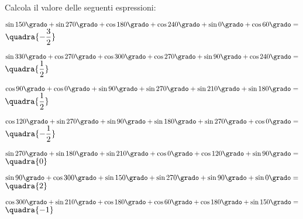 \begin{esercizio}\label{ese:}
 Calcola il valore delle seguenti espressioni:
 \begin{enumeratea}
  \item  $\sin 150 \grado+ \sin 270 \grado+ \cos 180 \grado+ 
          \cos 240 \grado+ \sin 0 \grado+ \cos 60 \grado= $
   \hfill $\quadra{-\dfrac{3}{2}}$
  \item  $\sin 330 \grado+ \cos 270 \grado+ \cos 300 \grado+ 
          \cos 270 \grado+ \sin 90 \grado+ \cos 240 \grado= $
   \hfill $\quadra{\dfrac{1}{2}}$
  \item  $\cos 90 \grado + \cos 0 \grado + \sin 90 \grado + 
          \sin 270 \grado + \sin 210 \grado + \sin 180 \grado = $
   \hfill $\quadra{\dfrac{1}{2}}$
  \item  $\cos 120 \grado + \sin 270 \grado + \sin 90 \grado + 
          \sin 180 \grado + \sin 270 \grado + \cos 0 \grado = $
   \hfill $\quadra{-\dfrac{1}{2}}$
  \item  $\sin 270 \grado + \sin 180 \grado + \sin 210 \grado + 
          \cos 0 \grado + \cos 120 \grado + \sin 90 \grado = $
   \hfill $\quadra{0}$
  \item  $\sin 90 \grado + \cos 300 \grado + \sin 150 \grado + 
          \sin 270 \grado + \sin 90 \grado + \sin 0 \grado = $
   \hfill $\quadra{2}$
  \item  $\cos 300 \grado + \sin 210 \grado + \cos 180 \grado + 
          \cos 60 \grado + \cos 180 \grado + \sin 150 \grado = $
   \hfill $\quadra{-1}$

\end{enumeratea}
\end{esercizio}
